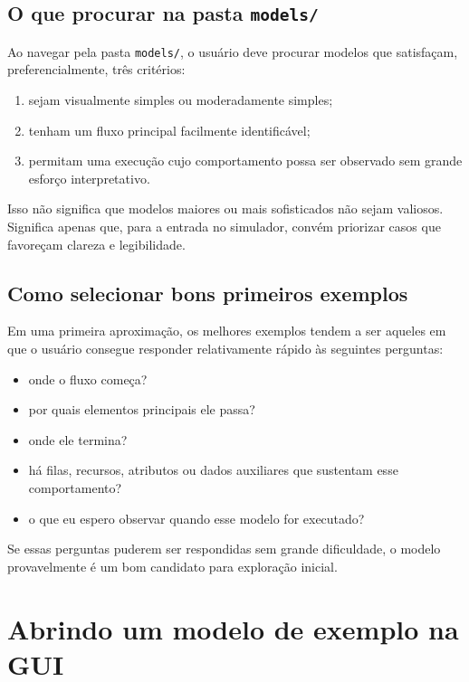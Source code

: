 \subsection{O que procurar na pasta \texttt{models/}}
\label{subsec:cap4_o_que_procurar_models}

Ao navegar pela pasta \texttt{models/}, o usuário deve procurar modelos que satisfaçam, preferencialmente, três critérios:

\begin{enumerate}
    \item sejam visualmente simples ou moderadamente simples;
    \item tenham um fluxo principal facilmente identificável;
    \item permitam uma execução cujo comportamento possa ser observado sem grande esforço interpretativo.
\end{enumerate}

Isso não significa que modelos maiores ou mais sofisticados não sejam valiosos. Significa apenas que, para a entrada no simulador, convém priorizar casos que favoreçam clareza e legibilidade.

\subsection{Como selecionar bons primeiros exemplos}
\label{subsec:cap4_como_selecionar_bons_exemplos}

Em uma primeira aproximação, os melhores exemplos tendem a ser aqueles em que o usuário consegue responder relativamente rápido às seguintes perguntas:
\begin{itemize}
    \item onde o fluxo começa?
    \item por quais elementos principais ele passa?
    \item onde ele termina?
    \item há filas, recursos, atributos ou dados auxiliares que sustentam esse comportamento?
    \item o que eu espero observar quando esse modelo for executado?
\end{itemize}

Se essas perguntas puderem ser respondidas sem grande dificuldade, o modelo provavelmente é um bom candidato para exploração inicial.

\section{Abrindo um modelo de exemplo na GUI}
\label{sec:cap4_abrindo_modelo_exemplo}

